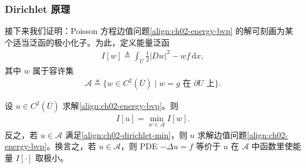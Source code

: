 \documentclass[../../main.tex]{subfiles}
\begin{document}
\subsubsection{Dirichlet 原理}

接下来我们证明：Poisson 方程边值问题\eqref{align:ch02-energy-bvp} 的解可刻画为某个适当泛函的极小化子。为此，定义能量泛函
\begin{align*}
I[w]\triangleq\int_U\frac{1}{2}|Dw|^2-wf\,\mathrm{d}x,
\end{align*}
其中 $w$ 属于容许集
\begin{align*}
\mathcal{A}\triangleq\{w\in C^2(\overline{U})\mid w=g\text{ 在 }\partial U\text{ 上}\}.
\end{align*}

\begin{theorem}[Dirichlet 原理]\label{theorem:ch02-dirichlet}设 $u\in C^2(\overline{U})$ 求解\eqref{align:ch02-energy-bvp}。则
\begin{align}\label{align:ch02-dirichlet-min}
I[u]=\min_{w\in\mathcal{A}}I[w].
\end{align}
反之，若 $u\in\mathcal{A}$ 满足\eqref{align:ch02-dirichlet-min}，则 $u$ 求解边值问题\eqref{align:ch02-energy-bvp}。换言之，若 $u\in\mathcal{A}$，则 PDE $-\Delta u=f$ 等价于 $u$ 在 $\mathcal{A}$ 中函数里使能量 $I[\cdot]$ 取极小。
\end{theorem}
\end{document}
